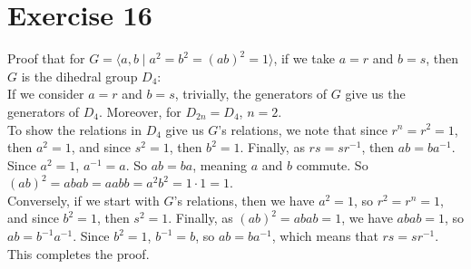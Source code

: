 \documentclass[12pt]{article}
\begin{document}
    \section*{Exercise 16}
    Proof that for $G = \langle a, b \mid a^2 = b^2 = (ab)^2 = 1 \rangle$,
    if we take $a = r$ and $b = s$,
    then $G$ is the dihedral group $D_4$: \\
    If we consider $a = r$ and $b = s$,
    trivially, the generators of $G$ give us the generators of $D_4$.
    Moreover, for $D_{2n} = D_4$, $n = 2$. \\
    To show the relations in $D_4$ give us $G$'s relations,
    we note that since $r^n = r^2 = 1$,
    then $a^2 = 1$,
    and since $s^2 = 1$,
    then $b^2 = 1$.
    Finally, as $rs = sr^{-1}$,
    then $ab = ba^{-1}$.
    Since $a^2 = 1$, $a^{-1} = a$.
    So $ab = ba$, meaning $a$ and $b$ commute.
    So $(ab)^2 = abab = aabb = a^2b^2 = 1 \cdot 1 = 1$. \\ 
    Conversely, if we start with $G$'s relations,
    then we have $a^2 = 1$,
    so $r^2 = r^n = 1$,
    and since $b^2 = 1$,
    then $s^2 = 1$.
    Finally, as $(ab)^2 = abab = 1$,
    we have $abab = 1$, so $ab = b^{-1}a^{-1}$.
    Since $b^2 = 1$, $b^{-1} = b$,
    so $ab = ba^{-1}$,
    which means that $rs = sr^{-1}$. \\
    This completes the proof.
\end{document}
